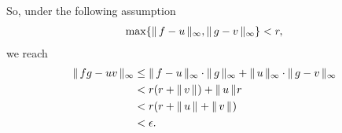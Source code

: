 %
So, under the following assumption %
%
\begin{align}
  \max\singleton{\norm{\infty}{f-u}, \norm{\infty}{g-v}} < r, %
\end{align}
we reach %
%
  \begin{align}
    \norm{\infty}{fg - uv} %
      & \leq 
    \norm{\infty}{f-u} \cdot \norm{\infty}{g} + 
    \norm{\infty}{u}   \cdot \norm{\infty}{g-v} \\
      & < r ( r + \norm{}{v} )  + \norm{}{u} r \\
      & < r(r + \norm{}{u} + \norm{}{v}) \\
      & < \epsilon. 
  \end{align}

